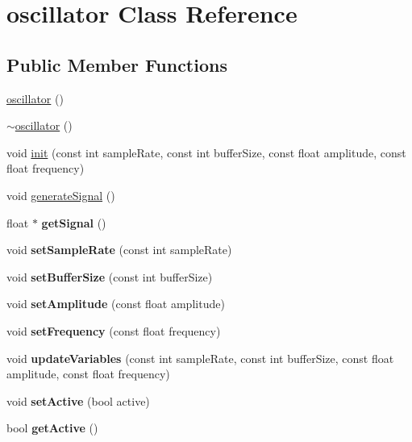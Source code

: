 \hypertarget{classoscillator}{}\section{oscillator Class Reference}
\label{classoscillator}
\subsection*{Public Member Functions}
\begin{DoxyCompactItemize}
\item 
\hyperlink{classoscillator_aa262e2f748efad616dbdeee5862e5e95}{oscillator} ()
\item 
\hyperlink{classoscillator_a17b258423ca052f1d873c40bd726f38a}{$\sim$oscillator} ()
\item 
void \hyperlink{classoscillator_ae1011086527d1596f735bbf3d8fc2fa7}{init} (const int sample\+Rate, const int buffer\+Size, const float amplitude, const float frequency)
\item 
void \hyperlink{classoscillator_a96348895fa640d490c96be06988d300c}{generate\+Signal} ()
\item 
\mbox{\label{classoscillator_a9e34b14ec87f1a9de3ec29a6bec909ac}} 
float $\ast$ {\bfseries get\+Signal} ()
\item 
\mbox{\label{classoscillator_a618693fdafc6351c3e613e27e5382c83}} 
void {\bfseries set\+Sample\+Rate} (const int sample\+Rate)
\item 
\mbox{\label{classoscillator_a2d00a3a68699673dddd8c670010cb049}} 
void {\bfseries set\+Buffer\+Size} (const int buffer\+Size)
\item 
\mbox{\label{classoscillator_a1d8ba95ce320bf00800e7e7e1230ab8c}} 
void {\bfseries set\+Amplitude} (const float amplitude)
\item 
\mbox{\label{classoscillator_a1dc2d0a2440711486a9215e34ee27828}} 
void {\bfseries set\+Frequency} (const float frequency)
\item 
\mbox{\label{classoscillator_af6a6cf14f63b55dd691ee90bab9dd70c}} 
void {\bfseries update\+Variables} (const int sample\+Rate, const int buffer\+Size, const float amplitude, const float frequency)
\item 
\mbox{\label{classoscillator_afb2d5a8580910db635cb21af49e2e154}} 
void {\bfseries set\+Active} (bool active)
\item 
\mbox{\label{classoscillator_a0ff4b5cec0bbbe737c9656c189bcb599}} 
bool {\bfseries get\+Active} ()
\end{DoxyCompactItemize}
